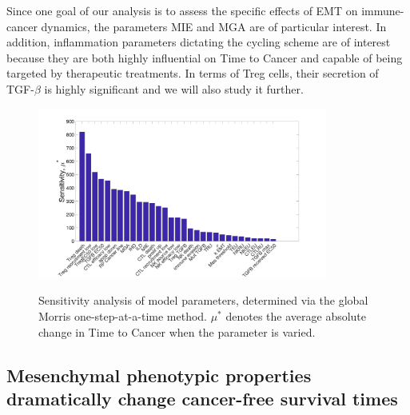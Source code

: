\documentclass[11pt]{article}
\begin{document}
Since one goal of our analysis is to assess the specific effects of EMT on immune-cancer dynamics, the parameters MIE and MGA are of particular interest.
In addition, inflammation parameters dictating the cycling scheme are of interest because they are both highly influential on Time to Cancer and capable of being targeted by therapeutic treatments.
In terms of Treg cells, their secretion of TGF-$\beta$ is highly significant and we will also study it further.


\begin{figure}
\center
{\includegraphics[width=0.85\textwidth]{Figure2/Figure2.jpg}}
\caption{Sensitivity analysis of model parameters, determined via the global Morris one-step-at-a-time method. $\mu^*$ denotes the average absolute change in Time to Cancer when the parameter is varied.}
\label{fig:MOAT}
\end{figure}

\subsection{Mesenchymal phenotypic properties dramatically change cancer-free survival times}\label{MesPars}
\end{document}
